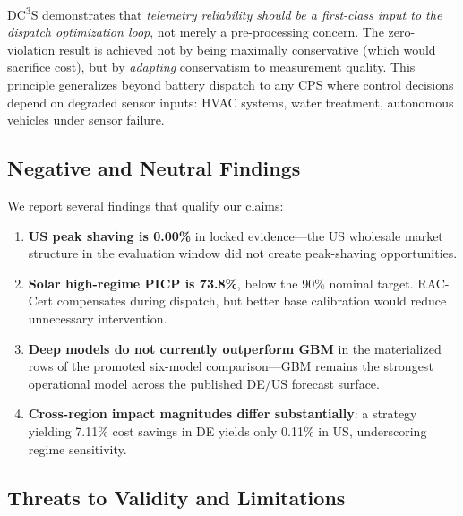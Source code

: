 \documentclass[11pt,a4paper,twocolumn]{article}
\begin{document}
DC\textsuperscript{3}S demonstrates that \emph{telemetry reliability should be a first-class input to the dispatch optimization loop}, not merely a pre-processing concern.  The zero-violation result is achieved not by being maximally conservative (which would sacrifice cost), but by \emph{adapting} conservatism to measurement quality.  This principle generalizes beyond battery dispatch to any CPS where control decisions depend on degraded sensor inputs: HVAC systems, water treatment, autonomous vehicles under sensor failure.

\subsection{Negative and Neutral Findings}

We report several findings that qualify our claims:
\begin{enumerate}[leftmargin=*,topsep=2pt,itemsep=1pt]
  \item \textbf{US peak shaving is 0.00\%} in locked evidence---the US wholesale market structure in the evaluation window did not create peak-shaving opportunities.
  \item \textbf{Solar high-regime PICP is 73.8\%}, below the 90\% nominal target.  RAC-Cert compensates during dispatch, but better base calibration would reduce unnecessary intervention.
  \item \textbf{Deep models do not currently outperform GBM} in the materialized rows of the promoted six-model comparison---GBM remains the strongest operational model across the published DE/US forecast surface.
  \item \textbf{Cross-region impact magnitudes differ substantially}: a strategy yielding 7.11\% cost savings in DE yields only 0.11\% in US, underscoring regime sensitivity.
\end{enumerate}

\subsection{Threats to Validity and Limitations}\label{sec:limitations}
\end{document}
